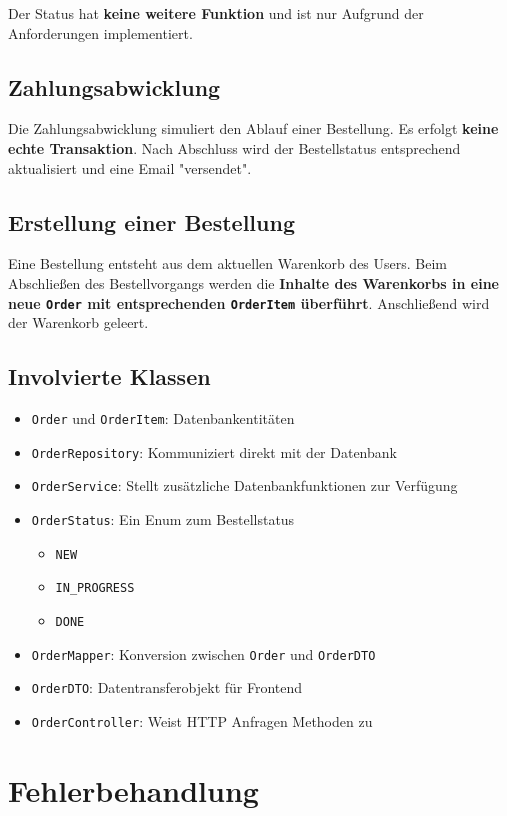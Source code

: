 \documentclass[12pt, a4paper]{scrreprt}
\begin{document}
			Der Status hat \textbf{keine weitere Funktion} und ist nur Aufgrund der Anforderungen implementiert.

		\section{Zahlungsabwicklung}
		
		Die Zahlungsabwicklung simuliert den Ablauf einer Bestellung. Es erfolgt \textbf{keine echte Transaktion}. Nach Abschluss wird der Bestellstatus entsprechend aktualisiert und eine Email "versendet".
		
		\section{Erstellung einer Bestellung}
		
		Eine Bestellung entsteht aus dem aktuellen Warenkorb des Users. Beim Abschließen des Bestellvorgangs werden die \textbf{Inhalte des Warenkorbs in eine neue \texttt{Order} mit entsprechenden \texttt{OrderItem} überführt}. Anschließend wird der Warenkorb geleert.
		
		
		\section{Involvierte Klassen}
		
		\begin{itemize}
			\item \texttt{Order} und \texttt{OrderItem}: Datenbankentitäten
			\item \texttt{OrderRepository}: Kommuniziert direkt mit der Datenbank
			\item \texttt{OrderService}: Stellt zusätzliche Datenbankfunktionen zur Verfügung
			\item \texttt{OrderStatus}: Ein Enum zum Bestellstatus
			\begin{itemize}
				\item \texttt{NEW}
				\item \texttt{IN\_PROGRESS}
				\item \texttt{DONE}
			\end{itemize}
			\item \texttt{OrderMapper}: Konversion zwischen \texttt{Order} und \texttt{OrderDTO}
			\item \texttt{OrderDTO}: Datentransferobjekt für Frontend
			\item \texttt{OrderController}: Weist HTTP Anfragen Methoden zu
		\end{itemize}
		
	\chapter{Fehlerbehandlung}
	
\end{document}
